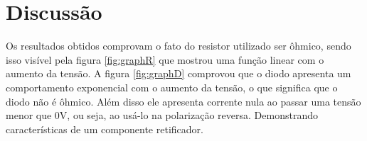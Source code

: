 \section{Discussão}
    Os resultados obtidos comprovam o fato do resistor
    utilizado ser ôhmico, sendo isso visível pela figura
    \ref{fig:graphR} que mostrou uma função linear com o aumento da tensão.
    \newline
    A figura \ref{fig:graphD} comprovou que o diodo apresenta um comportamento
    exponencial com o aumento da tensão, o que significa que o diodo não é ôhmico.
    Além disso ele apresenta corrente nula ao passar uma tensão menor que 0V, ou seja,
    ao usá-lo na polarização reversa. Demonstrando características de um componente retificador.
